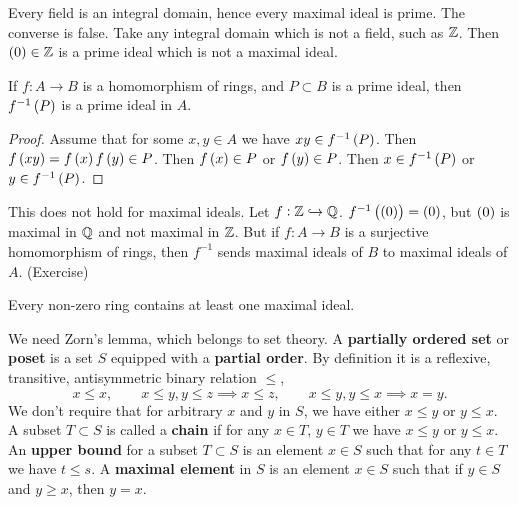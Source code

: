 \begin{remark}
Every field is an integral domain, hence every maximal ideal is prime. The converse is false. Take any integral domain which is not a field, such as $ \mathbb{Z} $. Then $ \br{0} \in \Z $ is a prime ideal which is not a maximal ideal.
\end{remark}

\begin{proposition}
If $ f : A \to B $ is a homomorphism of rings, and $ P \subset B $ is a prime ideal, then $ f^{-1}\br{P} $ is a prime ideal in $ A $.
\end{proposition}

\begin{proof}
Assume that for some $ x, y \in A $ we have $ xy \in f^{-1}\br{P} $. Then $ f\br{xy} = f\br{x}f\br{y} \in P $. Then $ f\br{x} \in P $ or $ f\br{y} \in P $. Then $ x \in f^{-1}\br{P} $ or $ y \in f^{-1}\br{P} $.
\end{proof}

\begin{remark}
This does not hold for maximal ideals. Let $ f : \mathbb{Z} \hookrightarrow \mathbb{Q} $. $ f^{-1}\br{\br{0}} = \br{0} $, but $ \br{0} $ is maximal in $ \mathbb{Q} $ and not maximal in $ \mathbb{Z} $. But if $ f : A \to B $ is a surjective homomorphism of rings, then $ f^{-1} $ sends maximal ideals of $ B $ to maximal ideals of $ A $. (Exercise)
\end{remark}

\begin{theorem}
\label{thm:4.6}
Every non-zero ring contains at least one maximal ideal.
\end{theorem}

We need Zorn's lemma, which belongs to set theory. A \textbf{partially ordered set} or \textbf{poset} is a set $ S $ equipped with a \textbf{partial order}. By definition it is a reflexive, transitive, antisymmetric binary relation $ \le $,
$$ x \le x, \qquad x \le y, y \le z \implies x \le z, \qquad x \le y, y \le x \implies x = y. $$
We don't require that for arbitrary $ x $ and $ y $ in $ S $, we have either $ x \le y $ or $ y \le x $. A subset $ T \subset S $ is called a \textbf{chain} if for any $ x \in T $, $ y \in T $ we have $ x \le y $ or $ y \le x $. An \textbf{upper bound} for a subset $ T \subset S $ is an element $ x \in S $ such that for any $ t \in T $ we have $ t \le s $. A \textbf{maximal element} in $ S $ is an element $ x \in S $ such that if $ y \in S $ and $ y \ge x $, then $ y = x $.


